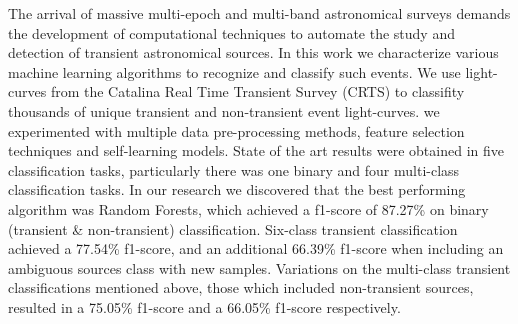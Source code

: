 


The arrival of massive multi-epoch and multi-band astronomical surveys
demands the development of computational techniques to automate the
study and detection of transient astronomical sources. 
In this work we characterize various machine learning algorithms to
recognize and classify such events.
We use light-curves from the Catalina Real Time Transient Survey
(CRTS) to classifity thousands of unique transient and non-transient
event light-curves.
we experimented  with multiple data pre-processing methods,
feature selection techniques and self-learning models. State of the
art results were obtained in five classification tasks, particularly
there was one binary and four multi-class classification tasks. 
In our research we discovered that the best performing algorithm was Random Forests, which achieved a f1-score of 87.27\% on binary (transient \& non-transient) classification. Six-class transient classification achieved a 77.54\% f1-score, and an additional 66.39\% f1-score when including an ambiguous sources class with new samples. Variations on the multi-class transient classifications mentioned above, those which included non-transient sources, resulted in a 75.05\% f1-score and a 66.05\% f1-score respectively.
